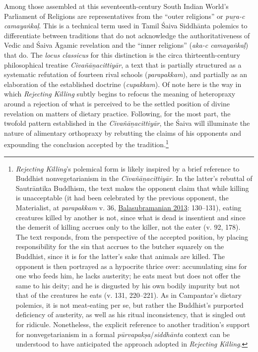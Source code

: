 Among those assembled at this seventeenth-century South Indian World’s Parliament of Religions are representatives from the “outer religions” or \emph{puṟa-c camayaṅkaḷ}. This is a technical term used in Tamil Śaiva Siddhānta polemics to differentiate between traditions that do not acknowledge the authoritativeness of Vedic and Śaiva Āgamic revelation and the “inner religions” (\emph{aka-c camayaṅkaḷ}) that do. The \emph{locus classicus} for this distinction is the circa thirteenth-century philosophical treatise \emph{{Civañāṉacittiyār}}, a text that is partially structured as a systematic refutation of fourteen rival schools (\emph{parapakkam}), and partially as an elaboration of the established doctrine (\emph{cupakkam}). Of note here is the way in which \emph{Rejecting Killing} subtly begins to refocus the meaning of heteropraxy around a rejection of what is perceived to be the settled position of divine revelation on matters of dietary practice. Following, for the most part, the twofold pattern established in the \emph{{Civañāṉacittiyār}}, the Śaiva will illuminate the nature of alimentary orthopraxy by rebutting the claims of his opponents and expounding the conclusion accepted by the tradition.\footnote{%
\emph{Rejecting Killing}’s polemical form is likely inspired by a brief reference to Buddhist nonvegetarianism in the \emph{{Civañāṉacittiyār}}. In the latter’s rebuttal of Sautrāntika Buddhism, the text makes the opponent claim that while killing is unacceptable (it had been celebrated by the previous opponent, the Materialist, at \emph{parapakkam} v. 36, \hyperref[Balasubramanian2013]{Balasubramanian 2013}: 130–131), eating creatures killed by another is not, since what is dead is insentient and since the demerit of killing accrues only to the killer, not the eater (v. 92, 178). The text responds, from the perspective of the accepted position, by placing responsibility for the sin that accrues to the butcher squarely on the Buddhist, since it is for the latter’s sake that animals are killed. The opponent is then portrayed as a hypocrite thrice over: accumulating sins for one who feeds him, he lacks austerity; he eats meat but does not offer the same to his deity; and he is disgusted by his own bodily impurity but not that of the creatures he eats (v. 131, 220–221). As in Campantar’s dietary polemics, it is not meat-eating per se, but rather the Buddhist’s purported deficiency of austerity, as well as his ritual inconsistency, that is singled out for ridicule. Nonetheless, the explicit reference to another tradition’s support for nonvegetarianism in a formal \emph{pūrvapakṣa}/\emph{siddhānta} context can be understood to have anticipated the approach adopted in \emph{Rejecting Killing}.
}



